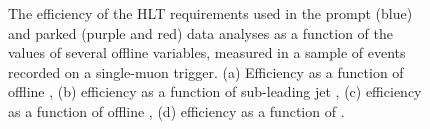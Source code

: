 \begin{figure}
  \caption{The efficiency of the \ac{HLT} requirements used in the prompt (blue) and parked (purple and red) data analyses as a function of the values of several offline variables, measured in a sample of events recorded on a single-muon trigger. (a) Efficiency as a function of offline \detajj, (b) efficiency as a function of sub-leading jet \pt, (c) efficiency as a function of offline \MET, (d) efficiency as a function of \Mjj.}
  \label{fig:prompttrigplots}
\end{figure}

